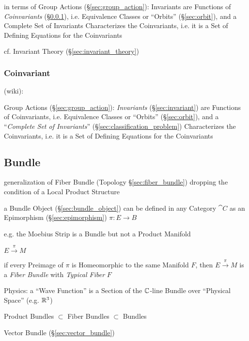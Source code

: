 in terms of Group Actions (\S\ref{sec:group_action}): Invariants are Functions
of \emph{Coinvariants} (\S\ref{sec:coinvariant}), i.e. Equivalence Classes or
``Orbits'' (\S\ref{sec:orbit}), and a Complete Set of Invariants Characterizes
the Coinvariants, i.e. it is a Set of Defining Equations for the Coinvariants

cf. Invariant Theory (\S\ref{sec:invariant_theory})



\subsubsection{Coinvariant}\label{sec:coinvariant}

(wiki):

Group Actions (\S\ref{sec:group_action}): \emph{Invariants}
(\S\ref{sec:invariant}) are Functions of Coinvariants, i.e. Equivalence Classes
or ``Orbits'' (\S\ref{sec:orbit}), and a ``\emph{Complete Set of Invariants}''
(\S\ref{sec:classification_problem}) Characterizes the Coinvariants, i.e. it is
a Set of Defining Equations for the Coinvariants



\subsection{Bundle}\label{sec:bundle}

generalization of Fiber Bundle (Topology \S\ref{sec:fiber_bundle}) dropping the
condition of a Local Product Structure

a Bundle Object (\S\ref{sec:bundle_object}) can be defined in any Category
$\cat{C}$ as an Epimorphism (\S\ref{sec:epimorphism}) $\pi : E \to B$

e.g. the Moebius Strip is a Bundle but not a Product Manifold

$E \xrightarrow{\pi} M$

if every Preimage of $\pi$ is Homeomorphic to the same Manifold $F$, then $E
\xrightarrow{\pi} M$ is a \emph{Fiber Bundle} with \emph{Typical Fiber} $F$

Physics: a ``Wave Function'' is a Section of the $\mathbb{C}$-line Bundle over
``Physical Space'' (e.g. $\mathbb{R}^3$)

Product Bundles $\subset$ Fiber Bundles $\subset$ Bundles

Vector Bundle (\S\ref{sec:vector_bundle})

